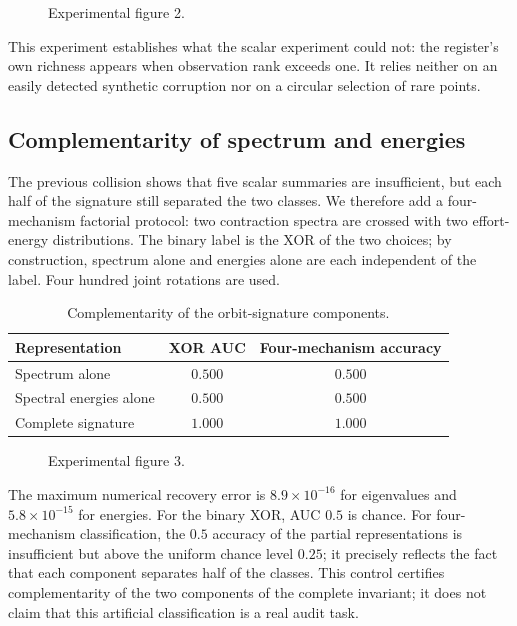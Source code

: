 \begin{figure}[htbp]
\centering{}
\caption{Experimental figure 2.}\label{fig:nonscalar-collision}
\end{figure}

This experiment establishes what the scalar experiment could not: the register's own richness appears when observation rank exceeds one. It relies neither on an easily detected synthetic corruption nor on a circular selection of rare points.

\subsection{Complementarity of spectrum and energies}
The previous collision shows that five scalar summaries are insufficient, but each half of the signature still separated the two classes. We therefore add a four-mechanism factorial protocol: two contraction spectra are crossed with two effort-energy distributions. The binary label is the XOR of the two choices; by construction, spectrum alone and energies alone are each independent of the label. Four hundred joint rotations are used.

\begin{table}[H]
\centering
\caption{Complementarity of the orbit-signature components.}
\label{tab:signature-complementarity}
\small
\begin{tabular}{@{}lcc@{}}
\toprule
Representation & XOR AUC & Four-mechanism accuracy \\
\midrule
Spectrum alone & $0.500$ & $0.500$ \\
Spectral energies alone & $0.500$ & $0.500$ \\
Complete signature & $1.000$ & $1.000$ \\
\bottomrule
\end{tabular}
\end{table}

\begin{figure}[htbp]
\centering{}
\caption{Experimental figure 3.}\label{fig:signature-complementarity}
\end{figure}

The maximum numerical recovery error is $8.9\times10^{-16}$ for eigenvalues and $5.8\times10^{-15}$ for energies. For the binary XOR, AUC $0.5$ is chance. For four-mechanism classification, the $0.5$ accuracy of the partial representations is insufficient but above the uniform chance level $0.25$; it precisely reflects the fact that each component separates half of the classes. This control certifies complementarity of the two components of the complete invariant; it does not claim that this artificial classification is a real audit task.

